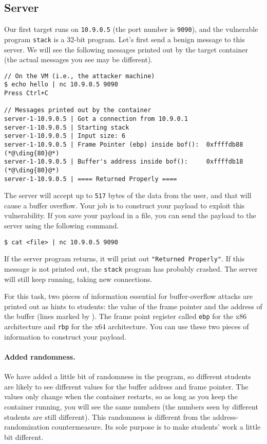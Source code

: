 \subsection{Server} 

Our first target runs on \texttt{10.9.0.5} (the port 
number is \texttt{9090}), and the vulnerable program \texttt{stack}
is a 32-bit program. 
Let's first send a benign message to this server.
We will see the following messages printed out by the target container (the
actual messages you see may be different).


\begin{lstlisting}
// On the VM (i.e., the attacker machine)
$ echo hello | nc 10.9.0.5 9090
Press Ctrl+C

// Messages printed out by the container
server-1-10.9.0.5 | Got a connection from 10.9.0.1
server-1-10.9.0.5 | Starting stack
server-1-10.9.0.5 | Input size: 6
server-1-10.9.0.5 | Frame Pointer (ebp) inside bof():  0xffffdb88    (*@\ding{80}@*)
server-1-10.9.0.5 | Buffer's address inside bof():     0xffffdb18    (*@\ding{80}@*)
server-1-10.9.0.5 | ==== Returned Properly ====
\end{lstlisting}


The server will accept up to \texttt{517} bytes of the data from the 
user, and that will cause a buffer overflow. Your job 
is to construct your payload to exploit this vulnerability. If 
you save your payload in a file, you can send the payload
to the server using the following command.

\begin{lstlisting}
$ cat <file> | nc 10.9.0.5 9090
\end{lstlisting}

If the server program returns, it will print out \texttt{"Returned Properly"}.
If this message is not printed out, the \texttt{stack} program has probably crashed. 
The server will still keep running, taking new connections.  

For this task, two pieces of information essential for buffer-overflow 
attacks are printed out as hints to students: 
the value of the frame pointer and the address
of the buffer (lines marked by ). The frame point register 
called \texttt{ebp} for the x86 architecture and \texttt{rbp} for the x64 architecture.
You can use these two pieces of information to construct 
your payload. 


\paragraph{Added randomness.} We have added a little bit of randomness
in the program, so different students are likely to see different values
for the buffer address and frame pointer. The values only change 
when the container restarts, so as long as you keep the 
container running, you will see the same numbers (the numbers 
seen by different students are still different). This randomness
is different from the address-randomization countermeasure. Its sole
purpose is to make students' work a little bit different. 


